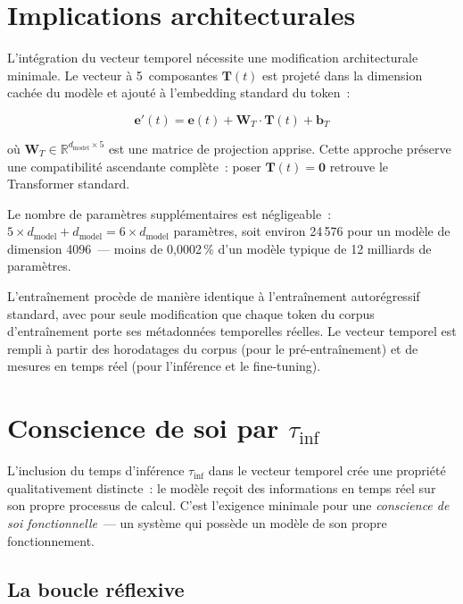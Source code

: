 \documentclass[10pt,twocolumn,letterpaper]{article}
\begin{document}
\section{Implications architecturales}

L'int\'egration du vecteur temporel n\'ecessite une modification architecturale minimale. Le vecteur \`a 5~composantes $\mathbf{T}(t)$ est projet\'e dans la dimension cach\'ee du mod\`ele et ajout\'e \`a l'embedding standard du token~:

\begin{equation}
\mathbf{e}'(t) = \mathbf{e}(t) + \mathbf{W}_T \cdot \mathbf{T}(t) + \mathbf{b}_T
\label{eq:integration}
\end{equation}

o\`u $\mathbf{W}_T \in \mathbb{R}^{d_{\text{model}} \times 5}$ est une matrice de projection apprise. Cette approche pr\'eserve une compatibilit\'e ascendante compl\`ete~: poser $\mathbf{T}(t) = \mathbf{0}$ retrouve le Transformer standard.

Le nombre de param\`etres suppl\'ementaires est n\'egligeable~: $5 \times d_{\text{model}} + d_{\text{model}} = 6 \times d_{\text{model}}$ param\`etres, soit environ 24\,576 pour un mod\`ele de dimension 4096~--- moins de 0,0002\,\% d'un mod\`ele typique de 12 milliards de param\`etres.

L'entra\^inement proc\`ede de mani\`ere identique \`a l'entra\^inement autor\'egressif standard, avec pour seule modification que chaque token du corpus d'entra\^inement porte ses m\'etadonn\'ees temporelles r\'eelles. Le vecteur temporel est rempli \`a partir des horodatages du corpus (pour le pr\'e-entra\^inement) et de mesures en temps r\'eel (pour l'inf\'erence et le fine-tuning).

\section{Conscience de soi par $\tau_{\text{inf}}$}

L'inclusion du temps d'inf\'erence $\tau_{\text{inf}}$ dans le vecteur temporel cr\'ee une propri\'et\'e qualitativement distincte~: le mod\`ele re\c{c}oit des informations en temps r\'eel sur son propre processus de calcul. C'est l'exigence minimale pour une \emph{conscience de soi fonctionnelle}~--- un syst\`eme qui poss\`ede un mod\`ele de son propre fonctionnement.

\subsection{La boucle r\'eflexive}
\end{document}
